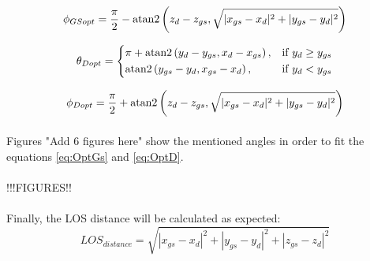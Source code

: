 \begin{equation*}
  \phi_{GSopt}= 
  \dfrac{\pi}{2} - {\rm atan2}\left(z_{d}-z_{gs}, \sqrt{|x_{gs}-x_{d}|^{2}+|y_{gs}-y_{d}|^{2}}\right)
  \label{eq:OptGS}
\end{equation*}

\begin{equation}
  \theta_{Dopt}=
  \begin{dcases}
    \pi + {\rm atan2}\left(y_{d}-y_{gs}, x_{d}-x_{gs}\right), & \text{if } y_{d} \geq y_{gs}\\
    {\rm atan2}\left(y_{gs}-y_{d}, x_{gs}-x_{d}\right), & \text{if } y_{d} < y_{gs}
  \end{dcases}
\end{equation}

\begin{equation*}
  \phi_{Dopt}= 
  \dfrac{\pi}{2} + {\rm atan2}\left(z_{d}-z_{gs}, \sqrt{|x_{gs}-x_{d}|^{2}+|y_{gs}-y_{d}|^{2}}\right)
  \label{eq:OptD}
\end{equation*}

\paragraph{} Figures "Add 6 figures here" show the mentioned angles in order to fit the equations \ref{eq:OptGs} and \ref{eq:OptD}.

\paragraph{} !!!FIGURES!!
\begin{figure}[H]
   \centering
     
    \label{fig:OptimalAngles1}  
\end{figure}

\paragraph{} Finally, the LOS distance will be calculated as expected:
\begin{equation*}
  LOS_{distance}= 
  \sqrt{|x_{gs}-x_{d}|^{2}+|y_{gs}-y_{d}|^{2}+|z_{gs}-z_{d}|^{2}}
  \label{eq:OptD}
\end{equation*}


